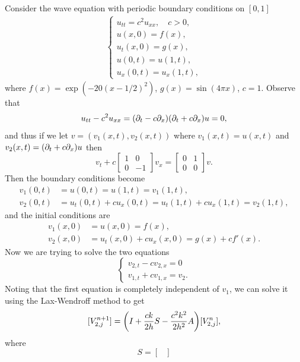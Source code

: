 \documentclass[12pt]{report}
\begin{document}
\begin{solution}

    \noindent
    Consider the wave equation with periodic boundary conditions on $[0,1]$\begin{align*}
      \begin{cases}
        u_{tt} = c^2 u_{xx}, \quad c > 0,\\
        u(x,0) = f(x),\\
        u_t(x,0) = g(x),\\
        u(0,t) = u(1,t),\\
        u_x(0,t) = u_x(1,t),
      \end{cases}
    \end{align*}
    where $f(x) = \exp( -20(x-1/2)^2 )$, $g(x) = \sin(4\pi x)$, $c = 1$. Observe that
    \[
      u_{tt} - c^2 u_{xx} = {\left(\partial_t - c \partial_x\right)}{\left(\partial_t + c \partial_x\right)}u = 0,
    \]
    and thus if we let $v = (v_1(x,t),v_2(x,t))$ where $v_1(x,t) = u(x,t)$ and $v_2(x,t) = {\left(\partial_t + c \partial_x\right)}u$ then
    \[ 
      v_t + c \begin{bmatrix}
        1 & 0\\ 0 & -1
      \end{bmatrix}v_x = \begin{bmatrix}
        0 & 1 \\ 0 & 0
      \end{bmatrix}v.
    \]
    Then the boundary conditions become
    \begin{align*}
      v_1(0,t) &= u(0,t) = u(1,t) = v_1(1,t),\\
      v_2(0,t) &= u_t(0,t) + cu_x(0,t) = u_t(1,t) + cu_x(1,t) = v_2(1,t), 
    \end{align*}
    and the initial conditions are
    \begin{align*}
      v_1(x,0) &= u(x,0) = f(x),\\
      v_2(x,0) &= u_t(x,0) + c u_x(x,0) = g(x) + c f'(x).
    \end{align*}
    Now we are trying to solve the two equations
    \[
      \begin{cases}
        v_{2,t} - c v_{2,x} = 0\\
        v_{1,t} + c v_{1,x} = v_2.
      \end{cases}
    \]
    Noting that the first equation is completely independent of $v_1$, we can solve it using the Lax-Wendroff method to get
    \[
      [V_{2,j}^{n+1}] = {\left(I + \frac{ck}{2h}S - \frac{c^2k^2}{2h^2}A\right)}[V_{2,j}^n],
    \]
    where
    \[
      S = \begin{bmatrix}

\end{bmatrix}\]
\end{solution}
\end{document}
